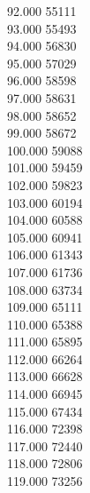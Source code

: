 { 92.000	55111 \\
 93.000	55493 \\
 94.000	56830 \\
 95.000	57029 \\
 96.000	58598 \\
 97.000	58631 \\
 98.000	58652 \\
 99.000	58672 \\
 100.000	59088 \\
 101.000	59459 \\
 102.000	59823 \\
 103.000	60194 \\
 104.000	60588 \\
 105.000	60941 \\
 106.000	61343 \\
 107.000	61736 \\
 108.000	63734 \\
 109.000	65111 \\
 110.000	65388 \\
 111.000	65895 \\
 112.000	66264 \\
 113.000	66628 \\
 114.000	66945 \\
 115.000	67434 \\
 116.000	72398 \\
 117.000	72440 \\
 118.000	72806 \\
 119.000	73256 \\
}
